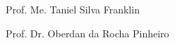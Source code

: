 \begin{folhaassinaturas}
{    \sigskip
    \beginskip
   \signature{Coordenador de curso: }{Prof. Me. Taniel Silva Franklin} \\
   \InstituicaoMembro{}{\theuniversity}
   
    \sigskip
    \beginskip
    \signature{Convidado: }{Prof. Dr. Oberdan da Rocha Pinheiro} \\
    \InstituicaoMembro{}{\theuniversity}

    \vfill
    \newpage
    \setcounter{page}{3}
}
\signaturepage

\end{folhaassinaturas}
